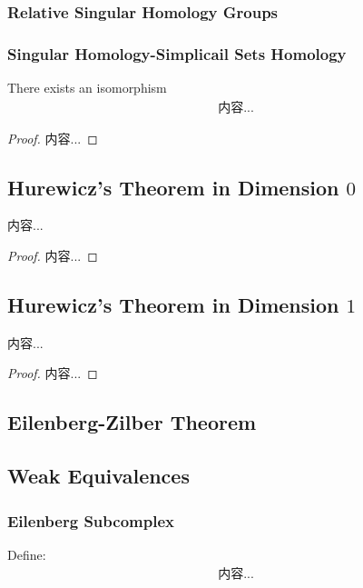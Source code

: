 \documentclass[Total.tex]{subfiles}
\begin{document}
			\subsubsection{Relative Singular Homology Groups}
			\subsubsection{Singular Homology-Simplicail Sets Homology}
				\begin{theorem}
					There exists an isomorphism
					\begin{gather*}
						内容...
					\end{gather*}
				\end{theorem}
				\begin{proof}
					内容...
				\end{proof}
			\subsection{Hurewicz's Theorem in Dimension $0$}
			
			\begin{theorem}
				内容...
			\end{theorem}
			\begin{proof}
				内容...
			\end{proof}
			\subsection{Hurewicz's Theorem in Dimension $1$}
				\begin{theorem}
					内容...
				\end{theorem}
				\begin{proof}
					内容...
				\end{proof}
			\subsection{Eilenberg-Zilber Theorem}
			\subsection{Weak Equivalences}
				\subsubsection{Eilenberg Subcomplex}
					\begin{Def}
						Define:
						\begin{gather*}
							内容...
						\end{gather*}
					\end{Def}
		
\end{document}
